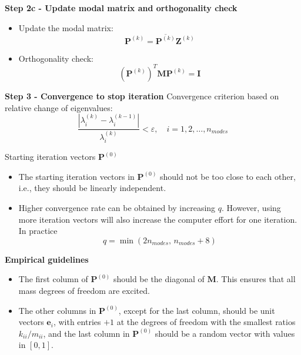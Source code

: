\documentclass[aspectratio=169]{beamer}
\begin{document}
\begin{frame}{}
  \textbf{Step 2c - Update modal matrix and orthogonality check}
  \vspace{0.3cm}
  \begin{itemize}
    \item Update the modal matrix:
          $$\mathbf P^{(k)} = \overline{\mathbf P^{(k)}} \mathbf Z^{(k)}$$
    \item Orthogonality check:
          \[
            (\mathbf P^{(k)})^T\mathbf M\mathbf P^{(k)} =\mathbf I
          \]
  \end{itemize}

  \textbf{Step 3 - Convergence to stop iteration}\newline
  Convergence criterion based on relative change of eigenvalues:
  \[
    \frac{|\lambda_i^{(k)} - \lambda_i^{(k-1)}|}{\lambda_i^{(k)}} < \varepsilon, \quad i = 1, 2, \dots, n_{modes}
  \]
\end{frame}


\begin{frame}{Starting iteration vectors $\mathbf P^{(0)}$}
  \begin{itemize}
    \item The starting iteration vectors in $\mathbf P^{(0)}$ should not be too close to each other, i.e., they should be linearly independent.
    \item Higher convergence rate can be obtained by increasing $q$. However, using more iteration vectors will also increase the computer effort for one iteration. In practice
          $$q=\min(2n_{modes},\, n_{modes} + 8)$$
  \end{itemize}
  \begin{tcolorbox}[colback=darkred!10,colframe=darkred!40!black]
    \textbf{Empirical guidelines}
    \begin{itemize}
      \item The first column of $\mathbf P^{(0)}$ should be the diagonal of $\mathbf M$. This ensures that all mass degrees of freedom are excited.
      \item The other columns in $\mathbf P^{(0)}$, except for the last column, should be unit vectors $\mathbf e_i$, with entries $+1$ at the degrees of freedom with the smallest ratios $k_{ii}/m_{ii}$, and the last column in $\mathbf P^{(0)}$ should be a random vector with values in $[0,1]$.
    \end{itemize}
  \end{tcolorbox}
\end{frame}
\end{document}
